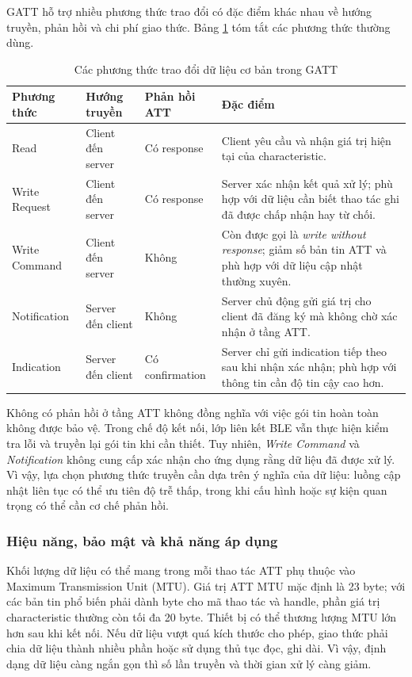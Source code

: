 GATT hỗ trợ nhiều phương thức trao đổi có đặc điểm khác nhau về hướng truyền, phản hồi và chi phí giao thức. Bảng \ref{tab:gatt_operations} tóm tắt các phương thức thường dùng.

\begin{table}[H]
\centering
\caption{Các phương thức trao đổi dữ liệu cơ bản trong GATT}
\label{tab:gatt_operations}
\small
\begin{tabularx}{\textwidth}{|p{3.0cm}|p{2.3cm}|p{3.0cm}|X|}
\hline
\textbf{Phương thức} & \textbf{Hướng truyền} & \textbf{Phản hồi ATT} & \textbf{Đặc điểm} \\
\hline
Read & Client đến server & Có response & Client yêu cầu và nhận giá trị hiện tại của characteristic. \\
\hline
Write Request & Client đến server & Có response & Server xác nhận kết quả xử lý; phù hợp với dữ liệu cần biết thao tác ghi đã được chấp nhận hay từ chối. \\
\hline
Write Command & Client đến server & Không & Còn được gọi là \textit{write without response}; giảm số bản tin ATT và phù hợp với dữ liệu cập nhật thường xuyên. \\
\hline
Notification & Server đến client & Không & Server chủ động gửi giá trị cho client đã đăng ký mà không chờ xác nhận ở tầng ATT. \\
\hline
Indication & Server đến client & Có confirmation & Server chỉ gửi indication tiếp theo sau khi nhận xác nhận; phù hợp với thông tin cần độ tin cậy cao hơn. \\
\hline
\end{tabularx}
\end{table}

Không có phản hồi ở tầng ATT không đồng nghĩa với việc gói tin hoàn toàn không được bảo vệ. Trong chế độ kết nối, lớp liên kết BLE vẫn thực hiện kiểm tra lỗi và truyền lại gói tin khi cần thiết. Tuy nhiên, \textit{Write Command} và \textit{Notification} không cung cấp xác nhận cho ứng dụng rằng dữ liệu đã được xử lý. Vì vậy, lựa chọn phương thức truyền cần dựa trên ý nghĩa của dữ liệu: luồng cập nhật liên tục có thể ưu tiên độ trễ thấp, trong khi cấu hình hoặc sự kiện quan trọng có thể cần cơ chế phản hồi.

\subsubsection{Hiệu năng, bảo mật và khả năng áp dụng}

Khối lượng dữ liệu có thể mang trong mỗi thao tác ATT phụ thuộc vào Maximum Transmission Unit (MTU). Giá trị ATT MTU mặc định là 23 byte; với các bản tin phổ biến phải dành byte cho mã thao tác và handle, phần giá trị characteristic thường còn tối đa 20 byte. Thiết bị có thể thương lượng MTU lớn hơn sau khi kết nối. Nếu dữ liệu vượt quá kích thước cho phép, giao thức phải chia dữ liệu thành nhiều phần hoặc sử dụng thủ tục đọc, ghi dài. Vì vậy, định dạng dữ liệu càng ngắn gọn thì số lần truyền và thời gian xử lý càng giảm.


